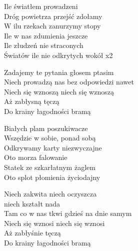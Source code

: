 
\begin{textn}
    \chordfill
    Ile światłem prowadzeni\\
    Dróg powietrza przejść zdołamy\\
    W ilu rzekach zanurzymy stopy\\
    Ile w nas zdumienia jeszcze\\
    Ile złudzeń nie straconych\\
    Światów ile nie odkrytych wokół x2

    Zadajemy te pytania głosem ptasim\\
    Niech prowadzą nas bez odpowiedzi nawet\\
    Niech się wznoszą niech się wznoszą\\
    Aż zabłysną tęczą\\
    Do krainy łagodności bramą

    \chordfill
    Białych plam poszukiwacze\\
    Wszędzie w sobie, ponad sobą\\
    Odkrywamy karty niezwyczajne\\
    Oto morza falowanie\\
    Statek ze szkarłatnym żaglem\\
    Oto splot płomienia życiodajny

    Niech zakwita niech oczyszcza\\
    niech kształt nada\\
    Tam co w nas tkwi gdzieś na dnie samym\\
    Niech się wznosi niech się wznosi\\
    Aż zabłyśnie tęczą\\
    Do krainy łagodności bramą
\end{textn}
